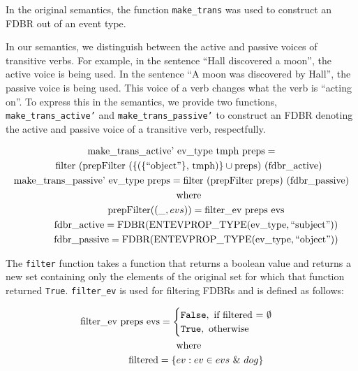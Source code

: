 \documentclass[../main.tex]{subfiles}
\begin{document}
In the original semantics, the function \texttt{make\_trans} was used to construct an FDBR out of an event type.

In our semantics, we distinguish between the active and passive voices of transitive verbs.  For example, in the sentence ``Hall discovered a moon'', the active voice is being used.
In the sentence ``A moon was discovered by Hall'', the passive voice is being used.  This voice of a verb changes what the verb is ``acting on''.  To express this in the semantics,
we provide two functions, \texttt{make\_trans\_active'} and \texttt{make\_trans\_passive'} to construct an FDBR denoting the active and passive voice of a transitive verb, respectfully.


\begin{gather*}
\text{make\_trans\_active' ev\_type tmph preps} = \\
	\text{\indent filter (prepFilter (\{(\{``object''\}, tmph)\}} \cup \text{preps) (\text{fdbr\_active})} \\
\text{make\_trans\_passive' ev\_type preps} = \text{filter (prepFilter preps) (\text{fdbr\_passive})} \\
\text{\indent where} \\
\text{\indent\indent prepFilter} ((\_, evs)) = \text{filter\_ev preps evs} \\
\text{\indent\indent fdbr\_active} = \text{FDBR}(\text{ENTEVPROP\_TYPE}(\text{ev\_type}, \text{``subject''})) \\
\text{\indent\indent fdbr\_passive} = \text{FDBR}(\text{ENTEVPROP\_TYPE}(\text{ev\_type}, \text{``object''}))
\end{gather*}

The \texttt{filter} function takes a function that returns a boolean value and returns a new set containing only the elements of the original set for which that function returned \texttt{True}.
\texttt{filter\_ev} is used for filtering FDBRs and is defined as follows:

\begin{gather*}
\text{filter\_ev preps evs} =
\begin{cases}
\texttt{False}, \text{ if filtered = } \emptyset \\
\texttt{True}, \text{ otherwise}
\end{cases} \\
\text{\indent where} \\
\text{\indent\indent filtered} = \{ev : ev \in evs \text{ \& }dog \}
\end{gather*}
\end{document}
